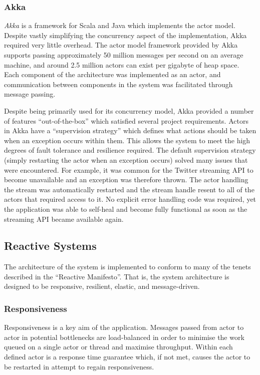 \documentclass{l4proj}
\begin{document}
\subsubsection{Akka}

    \textit{Akka} is a framework for Scala and Java which implements the actor model. Despite vastly simplifying the concurrency aspect of the implementation, Akka required very little overhead. The actor model framework provided by Akka supports passing approximately 50 million messages per second on an average machine, and around 2.5 million actors can exist per gigabyte of heap space. Each component of the architecture was implemented as an actor, and communication between components in the system was facilitated through message passing.
            
        
        Despite being primarily used for its concurrency model, Akka provided a number of features ``out-of-the-box'' which satisfied several project requirements. Actors in Akka have a ``supervision strategy'' which defines what actions should be taken when an exception occurs within them. This allows the system to meet the high degrees of fault tolerance and resilience required. The default supervision strategy (simply restarting the actor when an exception occurs) solved many issues that were encountered. For example, it was common for the Twitter streaming API to become unavailable and an exception was therefore thrown. The actor handling the stream was automatically restarted and the stream handle resent to all of the actors that required access to it. No explicit error handling code was required, yet the application was able to self-heal and become fully functional as soon as the streaming API became available again.

        \subsection{Reactive Systems}
        The architecture of the system is implemented to conform to many of the tenets described in the ``Reactive Manifesto''. That is, the system architecture is designed to be responsive, resilient, elastic, and message-driven.
        
            \subsubsection{Responsiveness}
            Responsiveness is a key aim of the application. Messages passed from actor to actor in potential bottlenecks are load-balanced in order to minimise the work queued on a single actor or thread and maximise throughput. Within each defined actor is a response time guarantee which, if not met, causes the actor to be restarted in attempt to regain responsiveness. 
            
\end{document}
